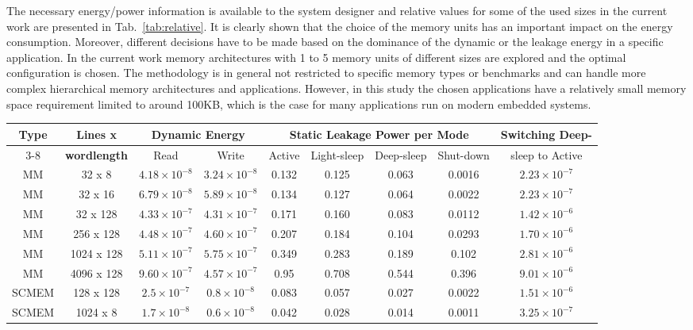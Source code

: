 \documentclass{acm_proc_article-sp}
\begin{document}
The necessary energy/power information is available to the system designer and relative values for some of the used sizes in the current work are presented in Tab.~\ref{tab:relative}. It is clearly shown that the choice of the memory units has an important impact on the energy consumption. Moreover, different decisions have to be made based on the dominance of the dynamic or the leakage energy in a specific application. In the current work memory architectures with 1 to 5 memory units  of different sizes are explored and the optimal configuration is chosen. The methodology is in general not restricted to specific memory types or benchmarks and can handle more complex hierarchical memory architectures and applications. However, in this study the chosen applications have a relatively small memory space requirement limited to around 100KB, which is the case for many applications run on modern embedded systems. 
\begin{center}
	\begin{table*}[!t]
	\caption{Relative energy for a range of memories with varying capacity and type}
	\label{tab:relative}
	{\small
\hfill{}
	\begin{tabular}{|c|c|c|c|c|c|c|c|c|}
		\hline
		\multirow{2}{*}{\textbf{Type}} & \textbf{Lines x} & \multicolumn{2}{c|}{\textbf{Dynamic Energy}}& \multicolumn{4}{c|}{\textbf{Static Leakage Power per Mode}} & {Switching Deep-} \\ \cline{3-8}
		& \textbf{wordlength} & Read & Write & Active & Light-sleep & Deep-sleep & Shut-down &sleep to Active\\ 
		\hline 
		MM & 32 x 8 &  $ 4.18 \times 10^{-8} $ &  $ 3.24 \times 10^{-8} $ & 0.132 & 0.125 & 0.063 & 0.0016 & $ 2.23 \times 10^{-7} $ \\ 
		\hline
		MM & 32 x 16 & $  6.79 \times 10^{-8} $ &  $ 5.89 \times 10^{-8} $ & 0.134 & 0.127 & 0.064 & 0.0022 & $ 2.23 \times 10^{-7} $ \\ 
		\hline
		MM & 32 x 128 & $  4.33 \times 10^{-7} $ &  $ 4.31 \times 10^{-7} $ & 0.171 & 0.160 & 0.083 & 0.0112 & $ 1.42 \times 10^{-6} $ \\ 
		\hline
		MM & 256 x 128 & $  4.48 \times 10^{-7} $ &  $ 4.60 \times 10^{-7} $ & 0.207 & 0.184 & 0.104 & 0.0293 & $ 1.70 \times 10^{-6} $ \\ 
		\hline
		MM & 1024 x 128 & $  5.11 \times 10^{-7} $ &  $ 5.75 \times 10^{-7} $ & 0.349 & 0.283 & 0.189 & 0.102 & $ 2.81 \times 10^{-6} $ \\ 
		\hline
		MM & 4096 x 128 & $  9.60 \times 10^{-7} $ &  $ 4.57 \times 10^{-7} $ & 0.95 & 0.708 & 0.544 & 0.396 & $ 9.01 \times 10^{-6} $ \\ 
		\hline
		SCMEM & 128 x 128 & $  2.5 \times 10^{-7} $ &  $ 0.8 \times 10^{-8} $ & 0.083 & 0.057 & 0.027 & 0.0022 & $ 1.51 \times 10^{-6} $ \\ 
		\hline
		SCMEM & 1024 x 8 & $  1.7 \times 10^{-8} $ &  $ 0.6 \times 10^{-8} $ & 0.042 &
		 0.028 & 0.014 & 0.0011 & $ 3.25 \times 10^{-7} $ \\ 
		\hline
	\end{tabular}}
	\end{table*}
\end{center}
\end{document}
